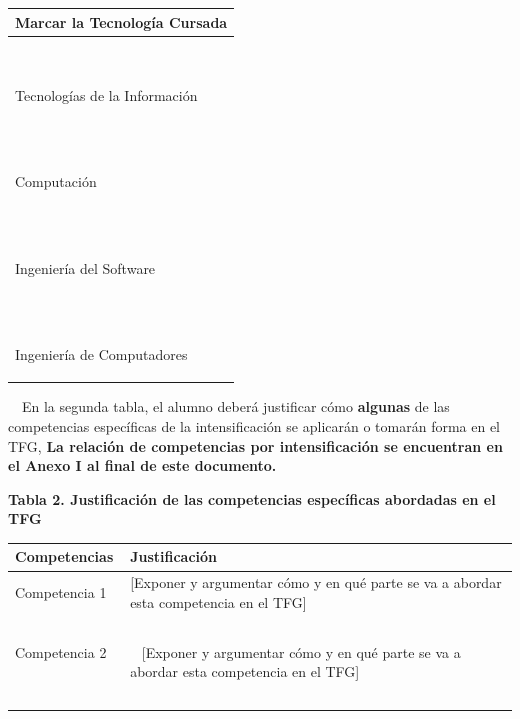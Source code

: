 \documentclass[a4paper]{article}
\begin{document}
\begin{center}
\tablefirsthead{}
\tablehead{}
\tabletail{}
\tablelasttail{}
\begin{supertabular}{m{6.803cm}}
{\bfseries Marcar la Tecnolog\'ia Cursada}
\\\hline
~

Tecnolog\'ias de la Informaci\'on\\
~

Computaci\'on\\
~

Ingenier\'ia del Software\\
~

Ingenier\'ia de Computadores\\\hline
\end{supertabular}
\end{center}



\clearpage\pagestyle{plain}
\thispagestyle{FirstPage}

\ \ En la segunda tabla, el alumno deber\'a justificar c\'omo \textbf{algunas} de las competencias espec\'ificas de la
intensificaci\'on se aplicar\'an o tomar\'an forma en el TFG, \textbf{La relaci\'on de competencias por
intensificaci\'on se encuentran en el Anexo I al final de este documento. }


\bigskip

{\centering\bfseries
Tabla 2. Justificaci\'on de las competencias espec\'ificas abordadas en el TFG
\par}

\begin{center}
\tablefirsthead{}
\tablehead{}
\tabletail{}
\tablelasttail{}
\begin{supertabular}{m{8.849cm}m{7.605cm}}
{\color{black} \textbf{Competencias}} &
{\color{black} \textbf{Justificaci\'on}}\\\hline
{\color{black} Competencia 1} &
{\color{black} [Exponer y argumentar c\'omo y en qu\'e parte se va a abordar esta competencia en el TFG]}\\
~
 &
~
\\
Competencia 2
~
 &
~
[Exponer y argumentar c\'omo y en qu\'e parte se va a abordar esta competencia en el TFG]
\\
~
 &
~
\\\hline
\end{supertabular}
\end{center}
\end{document}
